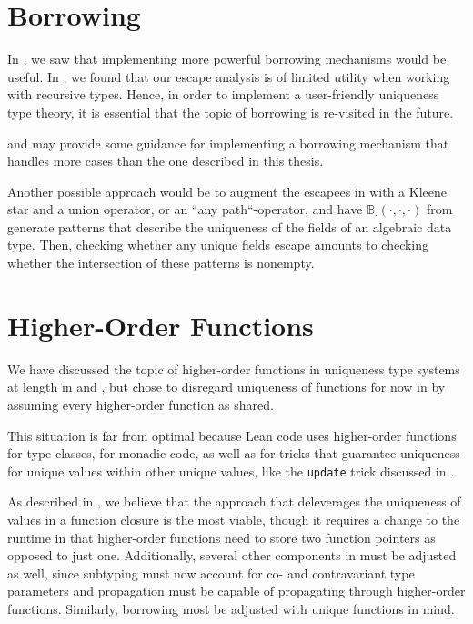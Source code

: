 \section{Borrowing}\label{sec:futureborrowing}
In , we saw that implementing more powerful borrowing mechanisms would be useful. In , we found that our escape analysis is of limited utility when working with recursive types. Hence, in order to implement a user-friendly uniqueness type theory, it is essential that the topic of borrowing is re-visited in the future.

\cite{spiwack_linearly_2022} and \cite{weiss_oxide_2021} may provide some guidance for implementing a borrowing mechanism that handles more cases than the one described in this thesis.

Another possible approach would be to augment the escapees in  with a Kleene star and a union operator, or an ``any path``-operator, and have $\mathbb{B}_\cdot(\cdot, \cdot, \cdot)$ from  generate patterns that describe the uniqueness of the fields of an algebraic data type. Then, checking whether any unique fields escape amounts to checking whether the intersection of these patterns is nonempty.

\section{Higher-Order Functions}
We have discussed the topic of higher-order functions in uniqueness type systems at length in  and , but chose to disregard uniqueness of functions for now in  by assuming every higher-order function as shared. 

This situation is far from optimal because Lean code uses higher-order functions for type classes, for monadic code, as well as for tricks that guarantee uniqueness for unique values within other unique values, like the \lstinline|update| trick discussed in . 

As described in , we believe that the approach that deleverages the uniqueness of values in a function closure is the most viable, though it requires a change to the runtime in that higher-order functions need to store two function pointers as opposed to just one. Additionally, several other components in  must be adjusted as well, since subtyping must now account for co- and contravariant type parameters and propagation must be capable of propagating through higher-order functions. Similarly, borrowing most be adjusted with unique functions in mind.

